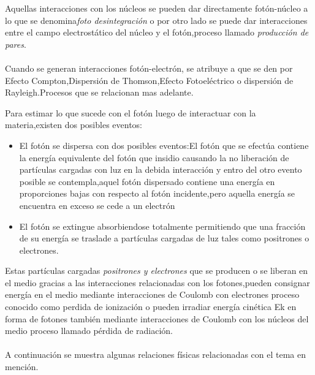 \documentclass[12pt,fleqn]{book} %
\numberwithin{equation}{section} %
\numberwithin{figure}{section} %
\numberwithin{table}{section} %
\begin{document}
Aquellas interacciones con los núcleos se pueden dar directamente fotón-núcleo a lo que se denomina\textit{foto desintegración } o por otro lado se puede dar interacciones entre el campo electrostático del núcleo y el fotón,proceso llamado\textit{ producción de pares}.
\\\\
Cuando se generan interacciones fotón-electrón, se atribuye a que se den por Efecto Compton,Dispersión de Thomson,Efecto Fotoeléctrico o dispersión de Rayleigh.Procesos que se relacionan mas adelante.



Para estimar lo que sucede con el fotón luego de interactuar con la materia,existen dos posibles eventos:

\begin{itemize}
 \item El fotón se dispersa con dos posibles eventos:El fotón que se efectúa contiene la energía equivalente del fotón que insidio causando la no liberación de partículas cargadas con luz en la debida interacción y entro del otro evento posible se contempla,aquel fotón dispersado contiene una energía en proporciones bajas con respecto al fotón incidente,pero aquella energía se encuentra en exceso se cede a un electrón  
 
 \item El fotón se extingue absorbiendose totalmente permitiendo que una fracción de su energía se traslade a partículas cargadas de luz tales como positrones o electrones.  
\end{itemize}

Estas partículas cargadas \textit{positrones y electrones} que se producen o se liberan en el medio gracias a las interacciones relacionadas con los fotones,pueden consignar energía en el medio mediante interacciones de Coulomb con electrones proceso conocido como perdida de ionización o pueden irradiar  energía cinética Ek en forma de fotones también mediante interacciones de Coulomb con los núcleos del medio proceso llamado pérdida de radiación.
\\\\
A continuación se muestra algunas relaciones físicas relacionadas  con el tema en mención.
\end{document}
